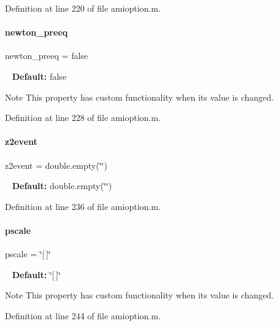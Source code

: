 Definition at line 220 of file amioption.\+m.

\mbox{\label{classamioption_a6f07b6b706ac3305e478f576747ad088}} 
\paragraph{\texorpdfstring{newton\+\_\+preeq}{newton\_preeq}}
{\footnotesize\ttfamily newton\+\_\+preeq = false}

~\newline
{\bfseries Default\+:} false

\begin{DoxyNote}{Note}
This property has custom functionality when its value is changed. 
\end{DoxyNote}


Definition at line 228 of file amioption.\+m.

\mbox{\label{classamioption_a7a7be015feeb7a346dceccd49e622b4b}} 
\paragraph{\texorpdfstring{z2event}{z2event}}
{\footnotesize\ttfamily z2event = double.\+empty(\char`\"{}\char`\"{})}

~\newline
{\bfseries Default\+:} double.\+empty(\char`\"{}\char`\"{}) 

Definition at line 236 of file amioption.\+m.

\mbox{\label{classamioption_a4dc67beb394b49ebeccf6a99dd932ee3}} 
\paragraph{\texorpdfstring{pscale}{pscale}}
{\footnotesize\ttfamily pscale = \char`\"{}\mbox{[}$\,$\mbox{]}\char`\"{}}

~\newline
{\bfseries Default\+:} \char`\"{}\mbox{[}$\,$\mbox{]}\char`\"{}

\begin{DoxyNote}{Note}
This property has custom functionality when its value is changed. 
\end{DoxyNote}


Definition at line 244 of file amioption.\+m.


